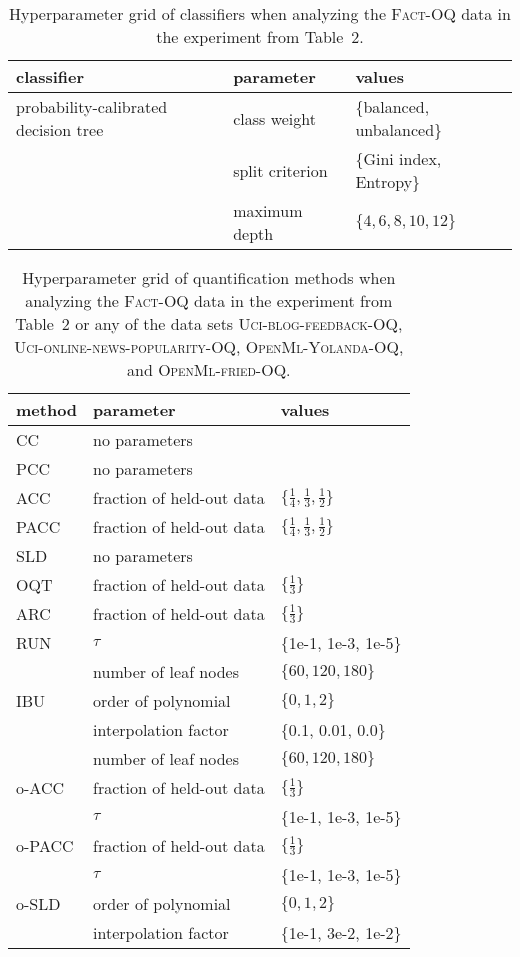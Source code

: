 \documentclass[10pt,a4paper]{article}
\begin{document}
\begin{table}
 \centering
 \caption{Hyperparameter grid of classifiers when analyzing the
 \textsc{Fact-OQ} data in the experiment from Table~2.}
 \label{tab:hyperparameter-fact-classifier}
 \footnotesize
 \begin{tabular}{lll}
 \toprule
 classifier & parameter & values \\
 \midrule
 probability-calibrated decision tree & class weight & \{balanced, unbalanced\} \\
 & split criterion & \{Gini index, Entropy\} \\
 & maximum depth & $\{4, 6, 8, 10, 12\}$ \\
 \bottomrule
 \end{tabular}
\end{table}

\begin{table}
 \centering
 \caption{Hyperparameter grid of quantification methods when
 analyzing the \textsc{Fact-OQ} data in the experiment from Table~2 or
 any of the data sets \textsc{Uci-blog-feedback-OQ},
 \textsc{Uci-online-news-popularity-OQ}, \textsc{OpenMl-Yolanda-OQ},
 and \textsc{OpenMl-fried-OQ}.}
 \label{tab:hyperparameter-fact-quantifier}
 \footnotesize
 \begin{tabular}{lll}
 \toprule
 method & parameter & values \\
 \midrule
 CC & no parameters & \\
 PCC & no parameters & \\
 ACC & fraction of held-out data & $\{\frac{1}{4}, \frac{1}{3}, \frac{1}{2}\}$ \\
 PACC & fraction of held-out data & $\{\frac{1}{4}, \frac{1}{3}, \frac{1}{2}\}$ \\
 SLD & no parameters & \\
 \midrule
 OQT & fraction of held-out data & $\{\frac{1}{3}\}$ \\
 ARC & fraction of held-out data & $\{\frac{1}{3}\}$ \\
 RUN & $\tau$ & $\{$1e-1, 1e-3, 1e-5$\}$ \\
 & number of leaf nodes & $\{60, 120, 180\}$ \\
 IBU & order of polynomial & $\{0, 1, 2\}$ \\
 & interpolation factor & $\{$0.1, 0.01, 0.0$\}$ \\
 & number of leaf nodes & $\{60, 120, 180\}$ \\
 \midrule
 o-ACC & fraction of held-out data & $\{\frac{1}{3}\}$ \\
 & $\tau$ & $\{$1e-1, 1e-3, 1e-5$\}$ \\
 o-PACC & fraction of held-out data & $\{\frac{1}{3}\}$ \\
 & $\tau$ & $\{$1e-1, 1e-3, 1e-5$\}$ \\
 o-SLD & order of polynomial & $\{0, 1, 2\}$ \\
 & interpolation factor & $\{$1e-1, 3e-2, 1e-2$\}$ \\
 \bottomrule
 \end{tabular}
\end{table}
\end{document}
